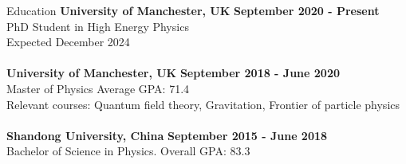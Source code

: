 \documentclass{resume} %
\begin{document}
    \begin{rSection}{Education}
        {\bf University of Manchester, UK} \hfill {\bf September 2020 - Present} 
        \\ PhD Student in High Energy Physics\hfill
        \\ Expected December 2024 
        \\[0pt]
        \ \\[0pt]
        {\bf University of Manchester, UK} \hfill {\bf September 2018 - June 2020} 
        \\ Master of Physics \hfill { Average GPA: 71.4 }
        \\ Relevant courses: Quantum field theory, Gravitation, Frontier of particle physics
        \\[0pt]
        \ \\[0pt]
        {\bf Shandong University, China} \hfill {\bf September 2015 - June 2018} 
        \\ Bachelor of Science in Physics.\hfill {  Overall GPA: 83.3 }
    \end{rSection}
\end{document}
